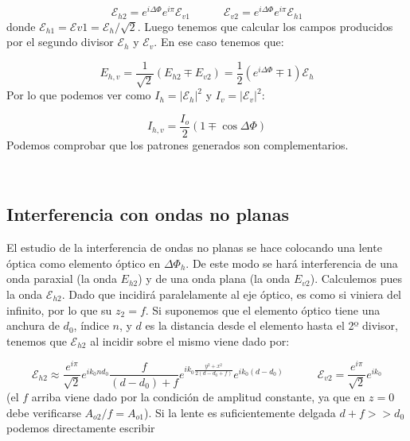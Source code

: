 \documentclass[12pt,a4paper]{book}
\numberwithin{equation}{section}
\numberwithin{figure}{section}
\newcommand{\tquad}{\quad \quad \quad}
\newcommand{\parentesis}[1]{\left( #1  \right)}
\newcommand{\1}{_{(1)}}
\newcommand{\2}{_{(2)}}
\newcommand{\Ecal}{\mathcal{E}}
\theoremstyle{definition}
\begin{document}
\begin{equation}
\Ecal_{h2} =  e^{i \Delta \Phi} e^{i \pi} \Ecal_{v1} \tquad
\Ecal_{v2} =  e^{i \Delta \Phi} e^{i \pi} \Ecal_{h1}
\end{equation} 
donde $\Ecal_{h1}=\Ecal{v1}=\Ecal_h/\sqrt{2}$. Luego tenemos que calcular los campos producidos por el segundo divisor $\mathcal{E}_h$ y $\mathcal{E}_v$. En ese caso tenemos que:

\begin{equation}
E_{h,v} = \frac{1}{\sqrt{2}} \parentesis{E_{h2} \mp E_{v2}} = \frac{1}{2} \parentesis{e^{i \Delta \Phi} \mp 1} \Ecal_h 
\end{equation}
Por lo que podemos ver como $I_h = |\mathcal{E}_h|^2$ y $I_v = |\mathcal{E}_v|^2$:

\begin{equation}
I_{h,v} = \frac{I_o}{2} (1 \mp \cos  \Delta \Phi)
\end{equation}
Podemos comprobar que los patrones generados son complementarios.

\hrulefill \\

\subsection{Interferencia con ondas no planas}

El estudio de la interferencia de ondas no planas se hace colocando una lente óptica como elemento óptico en $\Delta \Phi_h$. De este modo se hará interferencia de una onda paraxial (la onda $E_{h2}$) y de una onda plana (la onda $E_{v2}$). Calculemos pues la onda $\mathcal{E}_{h2}$. Dado que incidirá paralelamente al eje óptico, es como si viniera del infinito, por lo que su $z_2=f$. Si suponemos que el elemento óptico tiene una anchura de $d_0$, índice $n$, y $d$ es la distancia desde el elemento hasta el 2º divisor, tenemos que $\mathcal{E}_{h2}$ al incidir sobre el mismo viene dado por:

\begin{equation}
\mathcal{E}_{h2} \approx \frac{e^{i\pi}}{\sqrt{2}} e^{ik_0 n d_0} \frac{f}{(d-d_0)+f} e^{ik_0\frac{y^2+x^2}{2(d-d_0+f)}} e^{ik_0 (d-d_0)} \tquad 
\mathcal{E}_{v2} = \frac{e^{i\pi}}{\sqrt{2}} e^{i k_0}
\end{equation}
(el $f$ arriba viene dado por la condición de amplitud constante, ya que en $z=0$ debe verificarse $A_{o2}/f=A_{o1}$). Si la lente es suficientemente delgada $d+f>>d_0$ podemos directamente escribir
\end{document}

